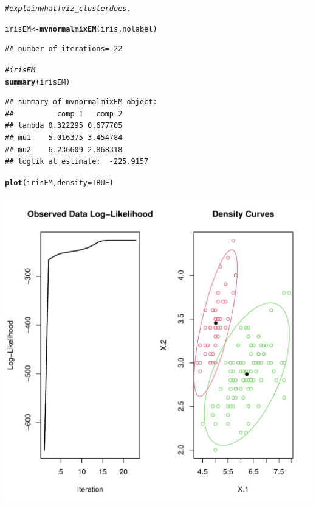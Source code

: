 \documentclass{article}\usepackage[]{graphicx}\usepackage[]{xcolor}
\makeatletter
\def\maxwidth{ %
  \ifdim\Gin@nat@width>\linewidth
    \linewidth
  \else
    \Gin@nat@width
  \fi
}
\newcommand{\hlnum}[1]{\textcolor[rgb]{0.686,0.059,0.569}{#1}}%
\newcommand{\hlcom}[1]{\textcolor[rgb]{0.678,0.584,0.686}{\textit{#1}}}%
\newcommand{\hlstd}[1]{\textcolor[rgb]{0.345,0.345,0.345}{#1}}%
\newcommand{\hlkwb}[1]{\textcolor[rgb]{0.69,0.353,0.396}{#1}}%
\newcommand{\hlkwc}[1]{\textcolor[rgb]{0.333,0.667,0.333}{#1}}%
\newcommand{\hlkwd}[1]{\textcolor[rgb]{0.737,0.353,0.396}{\textbf{#1}}}%
\newenvironment{kframe}{%
 \def\at@end@of@kframe{}%
 \ifinner\ifhmode%
  \def\at@end@of@kframe{\end{minipage}}%
  \begin{minipage}{\columnwidth}%
 \fi\fi%
 \def\FrameCommand##1{\hskip\@totalleftmargin \hskip-\fboxsep
 \colorbox{shadecolor}{##1}\hskip-\fboxsep
     \hskip-\linewidth \hskip-\@totalleftmargin \hskip\columnwidth}%
 \MakeFramed {\advance\hsize-\width
   \@totalleftmargin\z@ \linewidth\hsize
   \@setminipage}}%
 {\par\unskip\endMakeFramed%
 \at@end@of@kframe}
\newenvironment{knitrout}{}{} %
\theoremstyle{plain}
\theoremstyle{definition}
\theoremstyle{remark}
\makeatother
\begin{document}
\begin{knitrout}
{}


\begin{kframe}\begin{alltt}
\hlcom{# explain what fviz_cluster does.}

\hlstd{irisEM} \hlkwb{<-} \hlkwd{mvnormalmixEM}\hlstd{(iris.nolabel)}
\end{alltt}
\begin{verbatim}
## number of iterations= 22
\end{verbatim}
\begin{alltt}
\hlcom{# irisEM}
\hlkwd{summary}\hlstd{(irisEM)}
\end{alltt}
\begin{verbatim}
## summary of mvnormalmixEM object:
##          comp 1   comp 2
## lambda 0.322295 0.677705
## mu1    5.016375 3.454784
## mu2    6.236609 2.868318
## loglik at estimate:  -225.9157
\end{verbatim}
\begin{alltt}
\hlkwd{plot}\hlstd{(irisEM,} \hlkwc{density}\hlstd{=}\hlnum{TRUE}\hlstd{)}
\end{alltt}
\end{kframe}

{\centering \includegraphics[width=\maxwidth]{figure/myrcode3-2} 

}


\end{knitrout}
\newpage
\printbibliography
 

\end{document}
